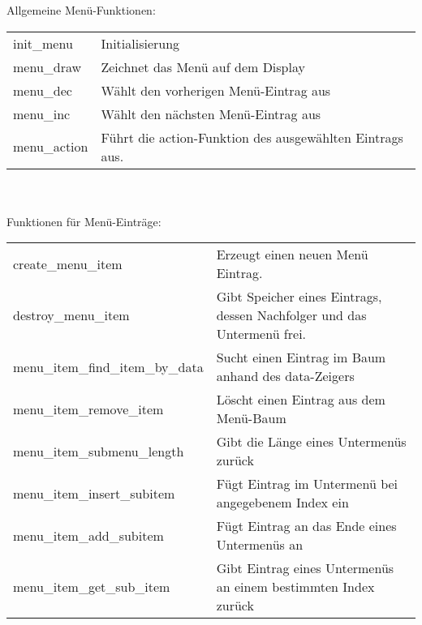 Allgemeine Menü-Funktionen:\\
\begin{tabularx}{\textwidth}{ll}
	init\_menu & Initialisierung \\
	menu\_draw & Zeichnet das Menü auf dem Display\\
	menu\_dec & Wählt den vorherigen Menü-Eintrag aus\\
	menu\_inc & Wählt den nächsten Menü-Eintrag aus\\
	menu\_action & Führt die action-Funktion des ausgewählten Eintrags aus.
\end{tabularx}\\
\\
Funktionen für Menü-Einträge:\\
\begin{tabularx}{\textwidth}{ll}
	create\_menu\_item & Erzeugt einen neuen Menü Eintrag. \\
	destroy\_menu\_item & Gibt Speicher eines Eintrags, dessen Nachfolger und das Untermenü frei.\\
	menu\_item\_find\_item\_by\_data & Sucht einen Eintrag im Baum anhand des data-Zeigers\\
	menu\_item\_remove\_item & Löscht einen Eintrag aus dem Menü-Baum\\
	menu\_item\_submenu\_length & Gibt die Länge eines Untermenüs zurück\\
	menu\_item\_insert\_subitem & Fügt Eintrag im Untermenü bei angegebenem Index ein\\
	menu\_item\_add\_subitem & Fügt Eintrag an das Ende eines Untermenüs an\\
	menu\_item\_get\_sub\_item & Gibt Eintrag eines Untermenüs an einem bestimmten Index zurück 
\end{tabularx}